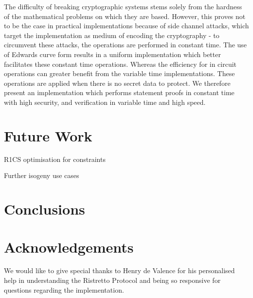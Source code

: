 \documentclass{article}
\theoremstyle{definition}
\theoremstyle{remark}
\begin{document}
	The difficulty of breaking cryptographic systems stems solely from the hardness of the mathematical problems on which they are based. However, this proves not to be the case in practical implementations because of side channel attacks, which target the implementation as medium of encoding the cryptography - to circumvent these attacks, the operations are performed in constant time. The use of Edwards curve form results in a uniform implementation which better facilitates these constant time operations.   Whereas the efficiency for in circuit operations can greater benefit from the variable time implementations. These operations are applied when there is no secret data to protect. We therefore present an implementation which performs statement proofs in constant time with high security, and verification in variable time and high speed. \\ 
	
	
	
	
	
	
	\section{Future Work}
	
	R1CS optimisation for constraints 
	
	Further isogeny use cases 
	
	\section{Conclusions}
	
	\section{Acknowledgements}
	
	We would like to give special thanks to Henry de Valence for his personalised help in understanding the Ristretto Protocol and being so responsive for questions regarding the implementation. 
	
	\newpage
	
	
	
	
\end{document}
